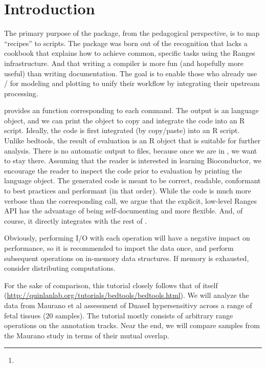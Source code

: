 \documentclass[10pt]{article}
\author{Michael Lawrence\thanks{\email{michafla@gene.com}}\\Genentech}
\date{\today}
\begin{document}
\maketitle
{}
\tableofcontents
\newpage


\section{Introduction}

The primary purpose of the  package, from the
pedagogical perspective, is to map  ``recipes'' to
\R{} scripts. The package was born out of the recognition
that \Bioconductor{} lacks a cookbook that explains how to achieve
common, specific tasks using the Ranges infrastructure. And that
writing a compiler is more fun (and hopefully more useful) than
writing documentation. The goal is to enable those who already use
\R{}/\Bioconductor{} for modeling and plotting to unify their workflow
by integrating their upstream processing.

 provides an \R{} function corresponding to each
 command. The output is an \R{} language object,
and we can print the object to copy and integrate the code into an R
script.  Ideally, the code is first integrated (by copy/paste) into an
R script. Unlike bedtools, the result of evaluation is an R object
that is suitable for further analysis. There is no automatic output to
files, because once we are in \R{}, we want to stay there. Assuming
that the reader is interested in learning Bioconductor, we encourage
the reader to inspect the code prior to evaluation by printing the
language object. The generated code is meant to be correct, readable,
conformant to best practices and performant (in that order). While the
code is much more verbose than the corresponding 
call, we argue that the explicit, low-level Ranges API has the
advantage of being self-documenting and more flexible. And, of course,
it directly integrates with the rest of \Bioconductor{}.

Obviously, performing I/O with each operation will have a negative
impact on performance, so it is recommended to import the data once,
and perform subsequent operations on in-memory data structures. If
memory is exhausted, consider distributing computations.

For the sake of comparison, this tutorial closely follows that of
 itself
(\url{http://quinlanlab.org/tutorials/bedtools/bedtools.html}). We
will analyze the data from Maurano et al \cite{maurano2012systematic}
assessment of DnaseI hypersensitivy across a range of fetal tissues
(20 samples). The  tutorial mostly consists of
arbitrary range operations on the annotation tracks. Near the end, we
will compare samples from the Maurano study in terms of their mutual
overlap.
\end{document}
